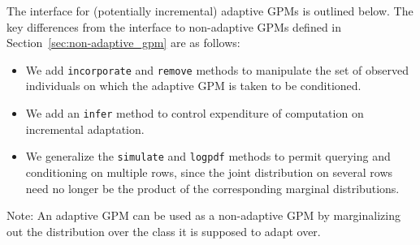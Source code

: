 \documentclass[10pt,letterpaper]{article}
\begin{document}
The interface for (potentially incremental) adaptive GPMs is outlined
below.  The key differences from the interface to non-adaptive GPMs
defined in Section~\ref{sec:non-adaptive_gpm} are as follows:

\begin{itemize}
\item We add \texttt{incorporate} and \texttt{remove} methods to
  manipulate the set of observed individuals on which the adaptive GPM
  is taken to be conditioned.
\item We add an \texttt{infer} method to control expenditure of
  computation on incremental adaptation.
\item We generalize the \texttt{simulate} and \texttt{logpdf} methods
  to permit querying and conditioning on multiple rows, since the
  joint distribution on several rows need no longer be the product of
  the corresponding marginal distributions.
\end{itemize}

Note: An adaptive GPM can be used as a non-adaptive GPM by
marginalizing out the distribution over the class it is supposed to
adapt over.
\end{document}
